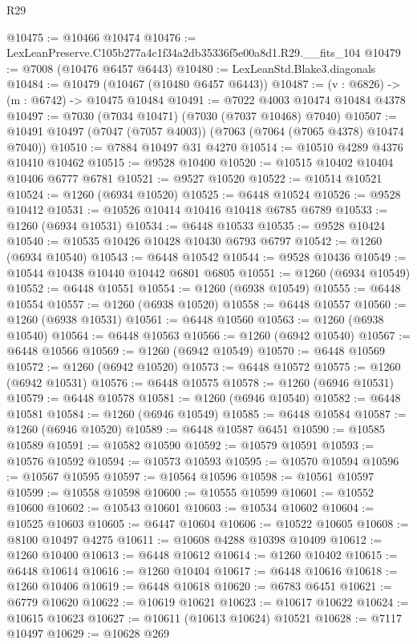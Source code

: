 \begin{lexlean}{R29}
\begin{coremodule}
@10475 := @10466 @10474
@10476 := LexLeanPreserve.C105b277a4c1f34a2db35336f5e00a8d1.R29.__fits_104
@10479 := @7008 (@10476 @6457 @6443)
@10480 := LexLeanStd.Blake3.diagonals
@10484 := @10479 (@10467 (@10480 @6457 @6443))
@10487 := (v : @6826) -> (m : @6742) -> @10475 @10484
@10491 := @7022 @4003 @10474 @10484 @4378
@10497 := @7030 (@7034 @10471) (@7030 (@7037 @10468) @7040)
@10507 := @10491 @10497 (@7047 (@7057 @4003)) (@7063 (@7064 (@7065 @4378) @10474 @7040))
@10510 := @7884 @10497 @31 @4270
@10514 := @10510 @4289 @4376 @10410 @10462
@10515 := @9528 @10400
@10520 := @10515 @10402 @10404 @10406 @6777 @6781
@10521 := @9527 @10520
@10522 := @10514 @10521
@10524 := @1260 (@6934 @10520)
@10525 := @6448 @10524
@10526 := @9528 @10412
@10531 := @10526 @10414 @10416 @10418 @6785 @6789
@10533 := @1260 (@6934 @10531)
@10534 := @6448 @10533
@10535 := @9528 @10424
@10540 := @10535 @10426 @10428 @10430 @6793 @6797
@10542 := @1260 (@6934 @10540)
@10543 := @6448 @10542
@10544 := @9528 @10436
@10549 := @10544 @10438 @10440 @10442 @6801 @6805
@10551 := @1260 (@6934 @10549)
@10552 := @6448 @10551
@10554 := @1260 (@6938 @10549)
@10555 := @6448 @10554
@10557 := @1260 (@6938 @10520)
@10558 := @6448 @10557
@10560 := @1260 (@6938 @10531)
@10561 := @6448 @10560
@10563 := @1260 (@6938 @10540)
@10564 := @6448 @10563
@10566 := @1260 (@6942 @10540)
@10567 := @6448 @10566
@10569 := @1260 (@6942 @10549)
@10570 := @6448 @10569
@10572 := @1260 (@6942 @10520)
@10573 := @6448 @10572
@10575 := @1260 (@6942 @10531)
@10576 := @6448 @10575
@10578 := @1260 (@6946 @10531)
@10579 := @6448 @10578
@10581 := @1260 (@6946 @10540)
@10582 := @6448 @10581
@10584 := @1260 (@6946 @10549)
@10585 := @6448 @10584
@10587 := @1260 (@6946 @10520)
@10589 := @6448 @10587 @6451
@10590 := @10585 @10589
@10591 := @10582 @10590
@10592 := @10579 @10591
@10593 := @10576 @10592
@10594 := @10573 @10593
@10595 := @10570 @10594
@10596 := @10567 @10595
@10597 := @10564 @10596
@10598 := @10561 @10597
@10599 := @10558 @10598
@10600 := @10555 @10599
@10601 := @10552 @10600
@10602 := @10543 @10601
@10603 := @10534 @10602
@10604 := @10525 @10603
@10605 := @6447 @10604
@10606 := @10522 @10605
@10608 := @8100 @10497 @4275
@10611 := @10608 @4288 @10398 @10409
@10612 := @1260 @10400
@10613 := @6448 @10612
@10614 := @1260 @10402
@10615 := @6448 @10614
@10616 := @1260 @10404
@10617 := @6448 @10616
@10618 := @1260 @10406
@10619 := @6448 @10618
@10620 := @6783 @6451
@10621 := @6779 @10620
@10622 := @10619 @10621
@10623 := @10617 @10622
@10624 := @10615 @10623
@10627 := @10611 (@10613 @10624) @10521
@10628 := @7117 @10497
@10629 := @10628 @269

\end{coremodule}
\end{lexlean}
